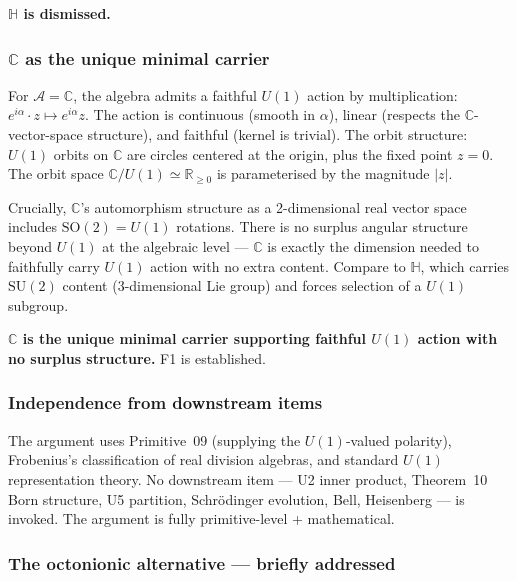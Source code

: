 \documentclass[11pt,a4paper]{article}
\begin{document}
\textbf{$\mathbb{H}$ is dismissed.}

\subsubsection{$\mathbb{C}$ as the unique minimal carrier}

For $\mathcal{A} = \mathbb{C}$, the algebra admits a faithful $U(1)$ action by multiplication: $e^{i \alpha} \cdot z \mapsto e^{i \alpha} z$. The action is continuous (smooth in $\alpha$), linear (respects the $\mathbb{C}$-vector-space structure), and faithful (kernel is trivial). The orbit structure: $U(1)$ orbits on $\mathbb{C}$ are circles centered at the origin, plus the fixed point $z = 0$. The orbit space $\mathbb{C}/U(1) \simeq \mathbb{R}_{\geq 0}$ is parameterised by the magnitude $|z|$.

Crucially, $\mathbb{C}$'s automorphism structure as a 2-dimensional real vector space includes $\mathrm{SO}(2) = U(1)$ rotations. There is no surplus angular structure beyond $U(1)$ at the algebraic level --- $\mathbb{C}$ is exactly the dimension needed to faithfully carry $U(1)$ action with no extra content. Compare to $\mathbb{H}$, which carries $\mathrm{SU}(2)$ content (3-dimensional Lie group) and forces selection of a $U(1)$ subgroup.

\textbf{$\mathbb{C}$ is the unique minimal carrier supporting faithful $U(1)$ action with no surplus structure.} F1 is established.

\subsubsection{Independence from downstream items}

The argument uses Primitive~09 (supplying the $U(1)$-valued polarity), Frobenius's classification of real division algebras, and standard $U(1)$ representation theory. No downstream item --- U2 inner product, Theorem~10 Born structure, U5 partition, Schr\"odinger evolution, Bell, Heisenberg --- is invoked. The argument is fully primitive-level + mathematical.

\subsubsection{The octonionic alternative --- briefly addressed}\label{sec:octonion}
\end{document}
